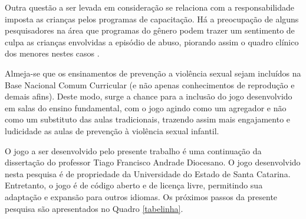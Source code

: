 
\pagebreak

Outra questão a ser levada em consideração se relaciona com a responsabilidade imposta as crianças pelos programas de capacitação. Há a preocupação de alguns pesquisadores na área que programas do gênero podem trazer um sentimento de culpa as crianças envolvidas a episódio de abuso, piorando assim o quadro clínico dos menores nestes casos \cite{finkelhor2009prevention}. %

Almeja-se que os ensinamentos de prevenção a violência sexual sejam incluídos na Base Nacional Comum Curricular (e não apenas conhecimentos de reprodução e demais afins). Deste modo, surge a chance para a inclusão do jogo desenvolvido em salas do ensino fundamental, com o jogo agindo como um agregador e não como um substituto das aulas tradicionais, trazendo assim mais engajamento e ludicidade as aulas de prevenção à violência sexual infantil.
   

O jogo a ser desenvolvido pelo presente trabalho é uma continuação da dissertação do professor Tiago Francisco Andrade Diocesano. %
O jogo desenvolvido nesta pesquisa é de propriedade da Universidade do Estado de Santa Catarina. Entretanto, o jogo é de código aberto e de licença livre, permitindo sua adaptação e expansão para outros idiomas. Os próximos passos da presente pesquisa são apresentados no Quadro \ref{tabelinha}.

